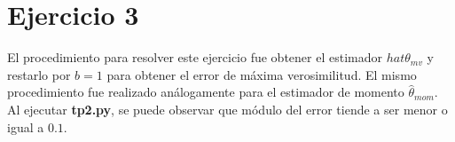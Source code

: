 \section{Ejercicio 3}
El procedimiento para resolver este ejercicio fue obtener el estimador $hat{\theta}_{mv}$ y restarlo por $b=1$ para obtener el error de máxima verosimilitud. El mismo procedimiento fue realizado análogamente para el estimador de momento $\hat{\theta}_{mom}$. Al ejecutar \textbf{tp2.py}, se puede observar que módulo del error tiende a ser menor o igual a $0.1$.